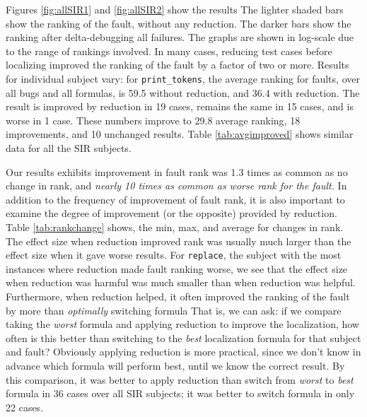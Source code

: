 Figures \ref{fig:allSIR1} and \ref{fig:allSIR2} show the
results
The
lighter shaded bars show the ranking of the fault, without any
reduction.  The darker bars show the ranking after delta-debugging all
failures.  The graphs are shown in log-scale due to the range of
rankings involved.  In many cases, reducing test cases before
localizing improved the ranking of the fault by a factor of two or
more.  Results for individual subject vary: for {\tt print\_tokens},
the average ranking for faults, over all bugs and all formulas, is
59.5 without reduction, and 36.4 with reduction.  The result is
improved by reduction in 19 cases, remains the same in 15 cases, and
is worse in 1 case.  These numbers improve to 29.8 average ranking, 18
improvements, and 10 unchanged results.
Table \ref{tab:avgimproved} shows similar data for all the SIR
subjects.  

Our results exhibits improvement in fault rank was 1.3 times as common as no change
in rank, and \emph{nearly 10 times as common as worse rank for the
fault.}  In addition to the frequency of improvement of fault rank, it
is also important to examine the degree of improvement (or the
opposite) provided by reduction.  Table \ref{tab:rankchange} shows,
the min, max, and average for changes in rank.  The effect
size when reduction improved rank was usually much larger than the
effect size when it gave worse results.  For {\tt replace}, the
subject with the most instances where reduction made fault ranking
worse, we see that the effect size when reduction was harmful was much
smaller than when reduction was helpful.  Furthermore, when reduction
helped, it often improved the ranking of the fault by more than
\emph{optimally} switching formula  That is, we can ask: if we compare
taking the \emph{worst} formula and applying reduction to improve the
localization, how often is this better than switching to the
\emph{best} localization formula for that subject and fault?
Obviously applying reduction is more practical, since we don't know in
advance which formula will perform best, until we know the correct
result.  By this comparison, it was better to
apply reduction than switch from \emph{worst} to \emph{best} formula
in 36 cases over all SIR subjects;  it was better to switch formula in
only 22 cases.



